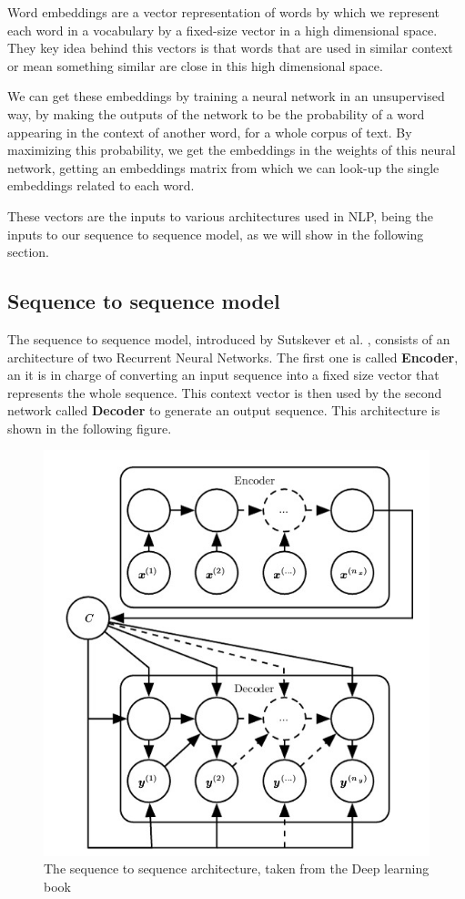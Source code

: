 \documentclass{llncs}
\begin{document}
Word embeddings are a vector representation of words by which we represent each word in a vocabulary by a fixed-size vector in a high dimensional space. They key idea behind this vectors is that words that are used in similar context or mean something similar are close in this high dimensional space.

We can get these embeddings by training a neural network in an unsupervised way, by making the outputs of the network to be the probability of a word appearing in the context of another word, for a whole corpus of text. By maximizing this probability, we get the embeddings in the weights of this neural network, getting an embeddings matrix from which we can look-up the single embeddings related to each word.

These vectors are the inputs to various architectures used in NLP, being the inputs to our sequence to sequence model, as we will show in the following section.

\subsection{Sequence to sequence model}

The sequence to sequence model, introduced by Sutskever et al. \cite{seq2seq}, consists of an architecture of two Recurrent Neural Networks. The first one is called \textbf{Encoder}, an it is in charge of converting an input sequence into a fixed size vector that represents the whole sequence. This context vector is then used by the second network called \textbf{Decoder} to generate an output sequence. This architecture is shown in the following figure.

\begin{figure}[H]
    \centering
    \includegraphics[scale=0.4]{../_img/img_dlb_encoderDecoder.jpg}
    \caption{The sequence to sequence architecture, taken from the Deep learning book \cite{deeplearningbook}}
    \label{fig:img_dlb_encoderDecoder}
\end{figure}
\end{document}
